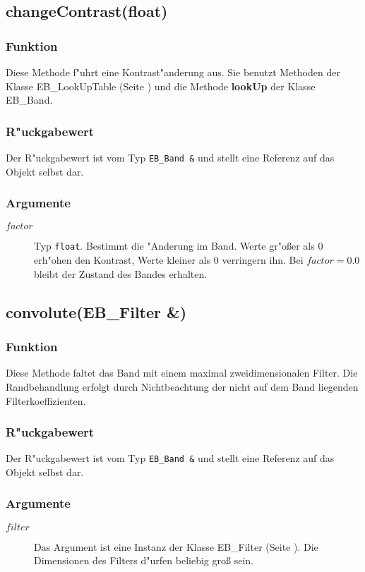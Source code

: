 \documentclass[12pt,a4paper,draft,twoside,onecolumn,titlepage]{book}
\newcommand{\pref}[1]{(Seite \pageref{#1})}
\newcommand{\method}[1]{{\bf #1}}
\newcommand{\carg}[1]{$ #1 $}
\newcommand{\ctyp}[1]{{\tt #1}}
\newcommand{\class}[1]{{\sc #1}}
\newcommand{\arglist}[1]{\footnotesize{#1}}
\begin{document}
\subsection{changeContrast{\arglist(float)}}
\subsubsection{Funktion}
Diese Methode f"uhrt eine Kontrast"anderung aus. Sie benutzt Methoden der Klasse \class{EB\_LookUpTable} \pref{classeblookuptable} und die Methode \method{lookUp} der Klasse \class{EB\_Band}.
\subsubsection{R"uckgabewert}
Der R"uckgabewert ist vom Typ \ctyp{EB\_Band \&} und stellt eine Referenz auf das Objekt selbst dar. 
\subsubsection{Argumente}
\begin{description}
\item[\carg{factor}]{Typ \ctyp{float}. Bestimmt die "Anderung im Band. Werte gr"o{\ss}er als $0$ erh"ohen den Kontrast, Werte kleiner als $0$ verringern ihn. Bei $factor=0.0$ bleibt der Zustand des Bandes erhalten.}
\end{description}
\subsection{convolute{\arglist(EB\_Filter \&)}}
\subsubsection{Funktion}
Diese Methode faltet das Band mit einem maximal zweidimensionalen Filter. Die Randbehandlung erfolgt durch Nichtbeachtung der nicht auf dem Band liegenden Filterkoeffizienten.
\subsubsection{R"uckgabewert}
Der R"uckgabewert ist vom Typ \ctyp{EB\_Band \&} und stellt eine Referenz auf das Objekt selbst dar. 
\subsubsection{Argumente}
\begin{description}
\item[\carg{filter}]{Das Argument ist eine Instanz der Klasse \class{EB\_Filter} \pref{classebfilter}. Die Dimensionen des Filters d"urfen beliebig gro{\ss} sein.}
\end{description}
\end{document}
